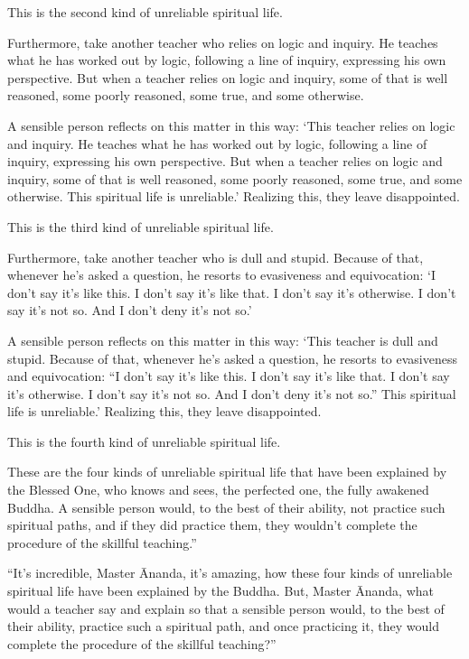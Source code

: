 \documentclass[12pt,openany]{book}%
\begin{document}
This is the second kind of unreliable spiritual life. 

Furthermore, take another teacher who relies on logic and inquiry. He teaches what he has worked out by logic, following a line of inquiry, expressing his own perspective. But when a teacher relies on logic and inquiry, some of that is well reasoned, some poorly reasoned, some true, and some otherwise. 

A sensible person reflects on this matter in this way: ‘This teacher relies on logic and inquiry. He teaches what he has worked out by logic, following a line of inquiry, expressing his own perspective. But when a teacher relies on logic and inquiry, some of that is well reasoned, some poorly reasoned, some true, and some otherwise. This spiritual life is unreliable.’ Realizing this, they leave disappointed. 

This is the third kind of unreliable spiritual life. 

Furthermore, take another teacher who is dull and stupid. Because of that, whenever he’s asked a question, he resorts to evasiveness and equivocation: ‘I don’t say it’s like this. I don’t say it’s like that. I don’t say it’s otherwise. I don’t say it’s not so. And I don’t deny it’s not so.’ 

A sensible person reflects on this matter in this way: ‘This teacher is dull and stupid. Because of that, whenever he’s asked a question, he resorts to evasiveness and equivocation: “I don’t say it’s like this. I don’t say it’s like that. I don’t say it’s otherwise. I don’t say it’s not so. And I don’t deny it’s not so.” This spiritual life is unreliable.’ Realizing this, they leave disappointed. 

This is the fourth kind of unreliable spiritual life. 

These are the four kinds of unreliable spiritual life that have been explained by the Blessed One, who knows and sees, the perfected one, the fully awakened Buddha. A sensible person would, to the best of their ability, not practice such spiritual paths, and if they did practice them, they wouldn’t complete the procedure of the skillful teaching.” 

“It’s incredible, Master Ānanda, it’s amazing, how these four kinds of unreliable spiritual life have been explained by the Buddha. But, Master Ānanda, what would a teacher say and explain so that a sensible person would, to the best of their ability, practice such a spiritual path, and once practicing it, they would complete the procedure of the skillful teaching?” 
\end{document}
